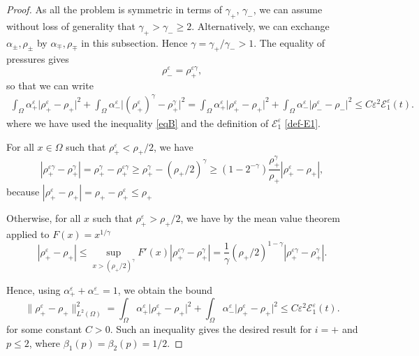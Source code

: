 \documentclass[11pt, twoside, a4paper]{article}
\theoremstyle{plain}
\theoremstyle{remark}
\numberwithin{equation}{section}
\def\EE{{\mathcal E}}
\renewcommand{\leq}{\leqslant}\renewcommand{\le}{\leqslant}
\renewcommand{\geq}{\geqslant}\renewcommand{\ge}{\geqslant}
\newcommand{\eps}{\varepsilon}
\newcommand{\gp}{\gamma_{+}}
\newcommand{\gm}{\gamma_-}
\begin{document}
\begin{proof}
As all the problem is symmetric in terms of $\gamma_+$, $\gamma_-$, we can assume without loss of generality that $\gamma_+>\gamma_-\geq 2$. Alternatively, we can exchange $\alpha_\pm, \rho_\pm$ by $\alpha_\mp, \rho_\mp$ in this subsection. Hence $\gamma = \gp/\gm >1$. The equality of pressures gives
\[
\rho_-^\eps = \rho_+^{\eps\gamma},
\]
so that we can write
\begin{align*}
\int_\Omega \alpha_+^\varepsilon \lvert \rho_+^\varepsilon - \rho_+ \rvert^2 
+ \int_\Omega \alpha_-^\varepsilon \lvert (\rho_+^\varepsilon)^\gamma - \rho_+^\gamma \rvert^2
=\int_\Omega \alpha_+^\varepsilon \lvert \rho_+^\varepsilon - \rho_+ \rvert^2 
+ \int_\Omega \alpha_-^\varepsilon \lvert \rho_-^\varepsilon - \rho_- \rvert^2 \leq C\eps^2 \EE_1^\eps(t).
\end{align*}
where we have used the inequality \eqref{eqB} and the definition of $\EE_1^\eps$ \eqref{def-E1}.

For all $x \in \Omega$ such that $\rho_+^\eps < \rho_+/2$, we have
$$|\rho_+^{\eps \gamma} -\rho_+^{ \gamma}|=\rho_+^{\gamma} -\rho_+^{\eps
\gamma}\geq \rho_+^{\gamma} - ( \rho_+/2)^\gamma 
\geq (1-2^{-\gamma})\frac{\rho_+^{\gamma}}{\rho_+} | \rho_+^{\eps} -\rho_+| ,$$
because $| \rho_+^{\eps} -\rho_+| = \rho_+ - \rho_+^{\eps} \leq \rho_+$


Otherwise, for all $x$ such that $\rho_+^\eps > \rho_+/2$, we have by the mean value theorem applied to $F(x) = x^{1/\gamma}$
$$|\rho_+^{\eps} -\rho_+| \leq \sup_{x>(\rho_+/2)^{\gamma}} F'(x) | \rho_+^{\eps\gamma} -\rho_+^\gamma| =\frac1\gamma (\rho_+/2) ^{1-\gamma} | \rho_+^{\eps\gamma} -\rho_+^\gamma|.$$

Hence, using $\alpha^\eps_+ +\alpha_-^\eps=1$, we obtain the bound
\begin{equation*}
\| \rho_+^\varepsilon - \rho_+ \|_{L^2(\Omega)}^2 = 
 \int_\Omega \alpha_+^\varepsilon \lvert \rho_+^\varepsilon - \rho_+ \rvert^2 
+ \int_\Omega \alpha_-^\varepsilon \lvert \rho_+^\varepsilon - \rho_+ \rvert^2\leq C\eps^2 \EE_1^\eps(t).
\end{equation*}
for some constant $C>0$. Such an inequality gives the desired result for $i=+$ and $p\leq 2$, where $\beta_1(p)=\beta_2(p)=1/2$.


\end{proof}
\end{document}
